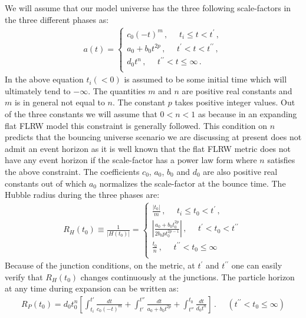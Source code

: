 \documentclass[24pt]{article}
\begin{document}
We will assume that our model universe has the three following
scale-factors in the three different phases as: 
\begin{eqnarray}
a(t)=\left\{
\begin{array}{ll}
c_0 (-t)^m\,,\,\,\,\,\,\,\,\,t_i \le t < t^\prime\,,\\
a_0 + b_0 t^{2p}\,,\,\,\,\,\,\,\,\, t^{\prime } < t < t^{\prime \prime}\,, \\
d_0 t^n \,,\,\,\,\,\,\,\,\,t^{\prime \prime} < t \le \infty\,.\\
\end{array}
\right.
\label{atc}
\end{eqnarray}
In the above equation $t_i(<0)$ is assumed to be some initial time
which will ultimately tend to $-\infty$. The quantities $m$ and $n$
are positive real constants and $m$ is in general not equal to $n$.
The constant $p$ takes positive integer values.  Out of the three
constants we will assume that $0< n < 1$ as because in an expanding
flat FLRW model this constraint is generally followed. This condition
on $n$ predicts that the bouncing universe scenario we are discussing
at present does not admit an event horizon as it is well known that
the flat FLRW metric does not have any event horizon if the
scale-factor has a power law form where $n$ satisfies the above
constraint. The coefficients $c_0$, $a_0$, $b_0$ and $d_0$ are also
positive real constants out of which $a_0$ normalizes the scale-factor
at the bounce time.  The Hubble radius during the three phases are:
\begin{eqnarray}
R_H(t_0) \equiv \frac{1}{|H(t_0)|}=\left\{
\begin{array}{ll}
\frac{|t_0|}{m}\,,\,\,\,\,\,\,\,\,t_i \le t_0 < t^\prime\,,\\
\left|\frac{a_0 + b_0 t_0^{2p}}{2b_0 p t_0^{2p-1}}\right|\,,\,\,\,\,\,\,\,\,
t^{\prime }
< t_0 < t^{\prime \prime}\, \\
\frac{t_0}{n} \,,\,\,\,\,\,\,\,\,t^{\prime \prime} < t_0 \le \infty\,\\
\end{array}
\right.
\end{eqnarray}
Because of the junction conditions, on the metric, at $t^\prime$ and
$t^{\prime\prime}$ one can easily verify that $R_H(t_0)$ changes
continuously at the junctions.  The particle horizon at any time
during expansion can be written as:
\begin{eqnarray}
R_P(t_0)= d_0 t_0^n \left [\int_{t_i}^{t'} \frac{dt}{c_0(-t)^m}+
  \int_{t'}^{t''} \frac{dt}{a_0 + b_0 t^{2p}} + \int_{t''}^{t_0}
  \frac{dt}{d_0t^n}\right]\,.\,\,\,\,\,\,\,\,(t^{\prime \prime} < t_0
\le \infty)
\label{rpd}
\end{eqnarray}
\end{document}
